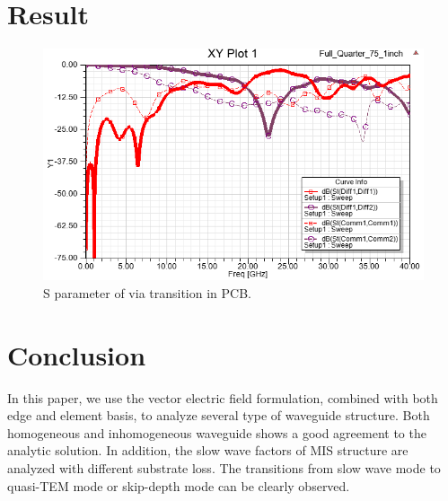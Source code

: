 \documentclass{pj}
\begin{document}
\section{Result}
\label{sec:result}


\begin{figure}[htbp!]
	\centering
	\includegraphics[width=0.8\columnwidth]{./img/PCB/Via_Transition/S_parameter.png}
	\caption{S parameter of via transition in PCB.}
	\label{fig:pcb_via_tran_S} %
\end{figure}


\section{Conclusion}
In this paper, we use the vector electric field formulation, combined with both edge and element basis, to analyze several type of waveguide structure. Both homogeneous and inhomogeneous  waveguide shows a good agreement to the analytic solution. In addition, the slow wave factors of MIS structure are analyzed with different substrate loss. The transitions from slow wave mode to quasi-TEM mode or skip-depth mode can be clearly observed. 


%
%

%
\end{document}

